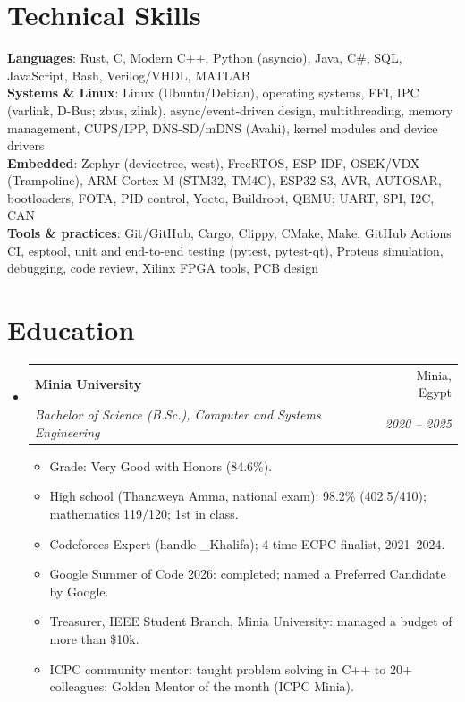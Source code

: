 \documentclass[letterpaper,11pt]{article}
\makeatletter
\newcommand{\resumeItem}[1]{
  \item\small{
    {#1 \vspace{-2pt}}
  }
}
\newcommand{\resumeSubheading}[4]{
  \vspace{-2pt}\item
    \begin{tabular*}{0.97\textwidth}[t]{l@{\extracolsep{\fill}}r}
      \textbf{#1} & #2 \\
      \textit{\small#3} & \textit{\small #4} \\
    \end{tabular*}\vspace{-7pt}
}
\newcommand{\resumeSubHeadingListStart}{\begin{itemize}[leftmargin=0.15in, label={}]}
\newcommand{\resumeSubHeadingListEnd}{\end{itemize}}
\newcommand{\resumeItemListStart}{\begin{itemize}}
\newcommand{\resumeItemListEnd}{\end{itemize}\vspace{-5pt}}
\makeatother
\begin{document}
%
\section{Technical Skills}
 \begin{itemize}[leftmargin=0.15in, label={}]
    \small{\item{
     \textbf{Languages}{: Rust, C, Modern C++, Python (asyncio), Java, C\#, SQL, JavaScript, Bash, Verilog/VHDL, MATLAB} \\
     \textbf{Systems \& Linux}{: Linux (Ubuntu/Debian), operating systems, FFI, IPC (varlink, D-Bus; zbus, zlink), async/event-driven design, multithreading, memory management, CUPS/IPP, DNS-SD/mDNS (Avahi), kernel modules and device drivers} \\
     \textbf{Embedded}{: Zephyr (devicetree, west), FreeRTOS, ESP-IDF, OSEK/VDX (Trampoline), ARM Cortex-M (STM32, TM4C), ESP32-S3, AVR, AUTOSAR, bootloaders, FOTA, PID control, Yocto, Buildroot, QEMU; UART, SPI, I2C, CAN} \\
     \textbf{Tools \& practices}{: Git/GitHub, Cargo, Clippy, CMake, Make, GitHub Actions CI, esptool, unit and end-to-end testing (pytest, pytest-qt), Proteus simulation, debugging, code review, Xilinx FPGA tools, PCB design}
    }}
 \end{itemize}

\section{Education}
  \resumeSubHeadingListStart
    \resumeSubheading
      {Minia University}{Minia, Egypt}
      {Bachelor of Science (B.Sc.), Computer and Systems Engineering}{2020 -- 2025}
      \resumeItemListStart
        \resumeItem{Grade: Very Good with Honors (84.6\%).}
        \resumeItem{High school (Thanaweya Amma, national exam): 98.2\% (402.5/410); mathematics 119/120; 1st in class.}
        \resumeItem{Codeforces Expert (handle \_Khalifa); 4-time ECPC finalist, 2021--2024.}
        \resumeItem{Google Summer of Code 2026: completed; named a Preferred Candidate by Google.}
        \resumeItem{Treasurer, IEEE Student Branch, Minia University: managed a budget of more than \$10k.}
        \resumeItem{ICPC community mentor: taught problem solving in C++ to 20+ colleagues; Golden Mentor of the month (ICPC Minia).}
      \resumeItemListEnd
  \resumeSubHeadingListEnd


\end{document}
